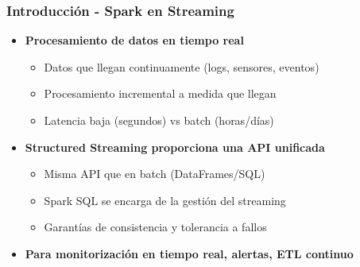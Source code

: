 \documentclass[aspectratio=169]{beamer}
\begin{document}
\begin{frame}\frametitle{Introducción - Spark en Streaming}
	\begin{itemize}
		\item \textbf{Procesamiento de datos en tiempo real}
		\begin{itemize}
			\item Datos que llegan continuamente (logs, sensores, eventos)
			\item Procesamiento incremental a medida que llegan
			\item Latencia baja (segundos) vs batch (horas/días)
		\end{itemize}

		\vspace{1em}

		\item \textbf{Structured Streaming proporciona una API unificada}
		\begin{itemize}
			\item Misma API que en batch (DataFrames/SQL)
			\item Spark SQL se encarga de la gestión del streaming
			\item Garantías de consistencia y tolerancia a fallos
		\end{itemize}

    \vspace{1em}

    \item \textbf{Para monitorización en tiempo real, alertas, ETL continuo}
	\end{itemize}
\end{frame}
\end{document}
